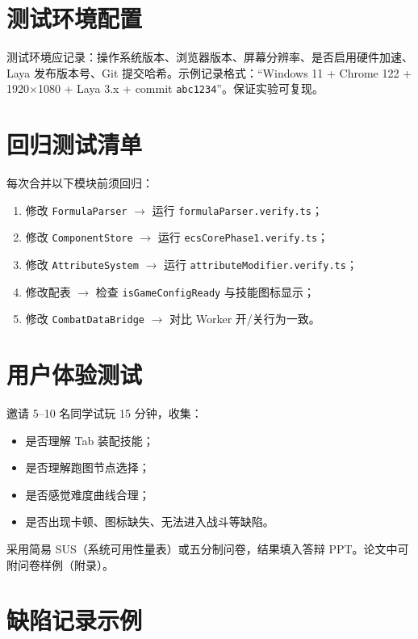 ﻿
\section{测试环境配置}

测试环境应记录：操作系统版本、浏览器版本、屏幕分辨率、是否启用硬件加速、Laya 发布版本号、Git 提交哈希。示例记录格式：“Windows 11 + Chrome 122 + 1920$\times$1080 + Laya 3.x + commit \texttt{abc1234}”。保证实验可复现\cite{petty2010vv}。

\section{回归测试清单}

每次合并以下模块前须回归：
\begin{enumerate}[label=\arabic*.]
  \item 修改 \texttt{FormulaParser} $\rightarrow$ 运行 \texttt{formulaParser.verify.ts}；
  \item 修改 \texttt{ComponentStore} $\rightarrow$ 运行 \texttt{ecsCorePhase1.verify.ts}；
  \item 修改 \texttt{AttributeSystem} $\rightarrow$ 运行 \texttt{attributeModifier.verify.ts}；
  \item 修改配表 $\rightarrow$ 检查 \texttt{isGameConfigReady} 与技能图标显示；
  \item 修改 \texttt{CombatDataBridge} $\rightarrow$ 对比 Worker 开/关行为一致。
\end{enumerate}

\section{用户体验测试}

邀请 5--10 名同学试玩 15 分钟，收集：
\begin{itemize}
  \item 是否理解 Tab 装配技能；
  \item 是否理解跑图节点选择；
  \item 是否感觉难度曲线合理；
  \item 是否出现卡顿、图标缺失、无法进入战斗等缺陷。
\end{itemize}

采用简易 SUS（系统可用性量表）或五分制问卷，结果填入答辩 PPT。论文中可附问卷样例（附录）。

\section{缺陷记录示例}

